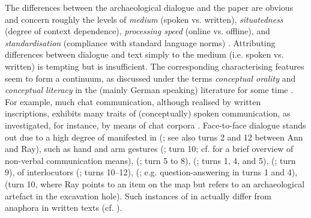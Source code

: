 \documentclass[output=paper]{langsci/langscibook}
\begin{document}
The differences between the archaeological dialogue and the paper are obvious and concern roughly the levels of \emph{medium}  (spoken vs. written), \emph{situatedness}  (degree of context dependence), \emph{processing speed}  (online vs. offline), and \emph{standardisation}  (compliance with standard language norms) \citep{Klein:1985}.
%
Attributing differences between dialogue and text simply to the medium (i.e. spoken vs. written) is tempting but is insufficient. 
%
The corresponding characterising features seem to form a continuum, as discussed under the terms \emph{conceptual orality}  and \emph{conceptual literacy}  in the (mainly German speaking) literature for some time \citep{Koch:Oesterreicher:1985}.
%
For example, much chat communication, although realised by written inscriptions, exhibits many traits of (conceptually) spoken communication, as investigated, for instance, by means of chat corpora \citep{Beisswenger:et:al:2012:a}. 
%
Face-to-face dialogue stands out due to a high degree of  manifested in  (\citep{Tomasello:1998}; see also turns 2 and 12 between Ann and Ray),  such as hand and arm gestures (\citep{Kendon:2004,McNeill:2000:a}; turn 10; cf.  for a brief overview of non-verbal communication means),  (\citealp{Ginzburg:Fernandez:Schlangen:2014}; turn 5 to 8),  (\citealp{Fernandez:Ginzburg:2002,Fernandez:Ginzburg:Lappin:2007}; turns 1, 4, and 5),  (\citealp{Ginzburg:Breitholz:Cooper:Hough:Tian:2015}; turn 9),  of interlocutors (\citealp{Clark:Schreuder:Buttrick:1983}; turns 10--12),  (\citealp{Sacks:Schegloff:Jefferson:1974,heldner2010,levinson2015}; e.g. question-answering in turns 1 and 4),  (turn 10, where Ray points to an item on the map but refers to an archaeological artefact in the excavation hole). Such instances of  \citep{Nunberg:1993} in  actually differ from  anaphora \citep{Clark:1975} in written texts (cf. \citealp{Luecking:2018:a}).
\end{document}
